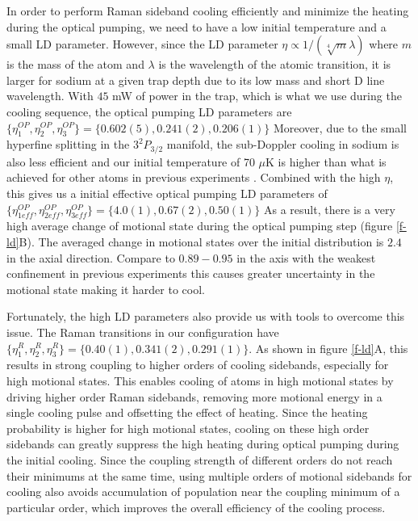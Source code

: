 \documentclass[aps,prl,twocolumn,groupedaddress]{revtex4-1}
\newcommand{\eff}{ef\! f}
\begin{document}
In order to perform Raman sideband cooling efficiently and minimize
the heating during the optical pumping, we need to have a low initial temperature and
a small LD parameter. However, since the LD parameter $\eta\propto 1/(\sqrt[4]{m}\lambda)$ where $m$ is the mass of the atom and $\lambda$ is the wavelength of the atomic transition,
it is larger for sodium at a given trap depth due to its low mass and short D line wavelength.
With $45$ mW of power in the trap, which is what we use during the cooling sequence,
the optical pumping LD parameters are
$\{\eta^{OP}_1,\eta^{OP}_2,\eta^{OP}_3\} = \{0.602(5), 0.241(2), 0.206(1)\}$
Moreover, due to the small hyperfine splitting in the $3^2P_{3/2}$ manifold,
the sub-Doppler cooling in sodium is also less efficient and our initial temperature of 70 $\mu$K
is higher than what is achieved for other atoms in previous experiments
\cite{Thompson2013,Kaufman2012,Li2012,Liu2017}.
Combined with the high $\eta$, this gives us a initial effective optical pumping LD parameters of
$\{\eta^{OP}_{1\eff},\eta^{OP}_{2\eff},\eta^{OP}_{3\eff}\} = \{4.0(1), 0.67(2), 0.50(1)\}$
As a result, there is a very high average change of motional state during the optical pumping step
(figure \ref{f-ld}B). The averaged change in motional states over the initial distribution
is $2.4$ in the axial direction.
Compare to $0.89-0.95$ in the axis with the weakest confinement in previous experiments
\cite{Thompson2013,Kaufman2012,Li2012,Liu2017} this causes greater uncertainty in the motional
state making it harder to cool.

Fortunately, the high LD parameters also provide us with tools to overcome this issue.
The Raman transitions in our configuration have
$\{\eta^R_{1},\eta^R_{2},\eta^R_{3}\} = \{0.40(1), 0.341(2), 0.291(1)\}$.
As shown in figure \ref{f-ld}A, this results in strong coupling to higher orders
of cooling sidebands, especially for high motional states.
This enables cooling of atoms in high motional states by driving higher order Raman sidebands,
removing more motional energy in a single cooling pulse and offsetting the effect of heating. Since the heating probability is higher for high motional states,
cooling on these high order sidebands can greatly suppress the high heating during
optical pumping during the initial cooling. Since the coupling strength of different orders
do not reach their minimums at the same time, using multiple orders of motional sidebands
for cooling also avoids accumulation of population near the coupling minimum of a particular
order, which improves the overall efficiency of the cooling process.
\end{document}
